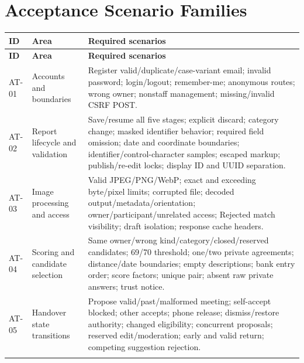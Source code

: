 \documentclass[12pt,a4paper,oneside]{report}
\begin{document}

\section{Acceptance Scenario Families}

\begin{longtable}{@{}P{0.11\dimexpr\textwidth-24pt\relax}P{0.22\dimexpr\textwidth-24pt\relax}P{0.67\dimexpr\textwidth-24pt\relax}@{}}

\toprule \textbf{ID} & \textbf{Area} & \textbf{Required scenarios} \\ \midrule\endfirsthead

\toprule \textbf{ID} & \textbf{Area} & \textbf{Required scenarios} \\ \midrule\endhead

\bottomrule\endfoot

AT-01 & Accounts and boundaries & Register valid/duplicate/case-variant email; invalid password; login/logout; remember-me; anonymous routes; wrong owner; nonstaff management; missing/invalid CSRF POST. \\ \addlinespace[3pt]

AT-02 & Report lifecycle and validation & Save/resume all five stages; explicit discard; category change; masked identifier behavior; required field omission; date and coordinate boundaries; identifier/control-character samples; escaped markup; publish/re-edit locks; display ID and UUID separation. \\ \addlinespace[3pt]

AT-03 & Image processing and access & Valid JPEG/PNG/WebP; exact and exceeding byte/pixel limits; corrupted file; decoded output/metadata/orientation; owner/participant/unrelated access; Rejected match visibility; draft isolation; response cache headers. \\ \addlinespace[3pt]

AT-04 & Scoring and candidate selection & Same owner/wrong kind/category/closed/reserved candidates; 69/70 threshold; one/two private agreements; distance/date boundaries; empty descriptions; bank entry order; score factors; unique pair; absent raw private answers; trust notice. \\ \addlinespace[3pt]

AT-05 & Handover state transitions & Propose valid/past/malformed meeting; self-accept blocked; other accepts; phone release; dismiss/restore authority; changed eligibility; concurrent proposals; reserved edit/moderation; early and valid return; competing suggestion rejection. \\ \addlinespace[3pt]


\end{longtable}
\end{document}
